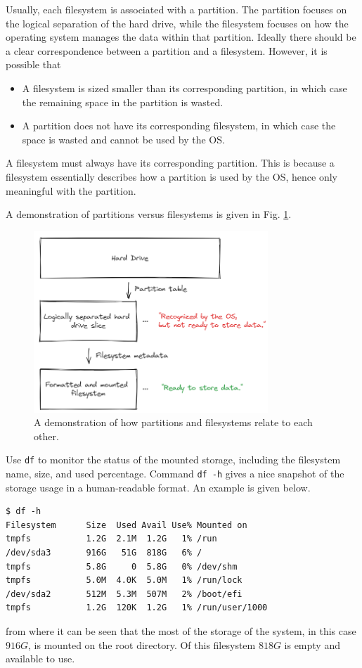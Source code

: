 Usually, each filesystem is associated with a partition. The partition focuses on the logical separation of the hard drive, while the filesystem focuses on how the operating system manages the data within that partition. Ideally there should be a clear correspondence between a partition and a filesystem. However, it is possible that 
\begin{itemize}
  \item A filesystem is sized smaller than its corresponding partition, in which case the remaining space in the partition is wasted.
  \item A partition does not have its corresponding filesystem, in which case the space is wasted and cannot be used by the OS.
\end{itemize}
A filesystem must always have its corresponding partition. This is because a filesystem essentially describes how a partition is used by the OS, hence only meaningful with the partition.

A demonstration of partitions versus filesystems is given in Fig. \ref{ch:dm:fig:partitionvsfilesystem}.
\begin{figure}[!htb]
	\centering
	\includegraphics[width=250pt]{chapters/part-2/figures/partitionvsfilesystem.png}
	\caption{A demonstration of how partitions and filesystems relate to each other.} \label{ch:dm:fig:partitionvsfilesystem}
\end{figure}


Use \verb|df| to monitor the status of the mounted storage, including the filesystem name, size, and used percentage. Command \verb|df -h| gives a nice snapshot of the storage usage in a human-readable format. An example is given below.
\begin{lstlisting}
$ df -h
Filesystem      Size  Used Avail Use% Mounted on
tmpfs           1.2G  2.1M  1.2G   1% /run
/dev/sda3       916G   51G  818G   6% /
tmpfs           5.8G     0  5.8G   0% /dev/shm
tmpfs           5.0M  4.0K  5.0M   1% /run/lock
/dev/sda2       512M  5.3M  507M   2% /boot/efi
tmpfs           1.2G  120K  1.2G   1% /run/user/1000
\end{lstlisting}
from where it can be seen that the most of the storage of the system, in this case $916G$, is mounted on the root directory. Of this filesystem $818G$ is empty and available to use.

